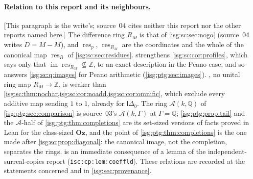 \documentclass[11pt]{article}
\theoremstyle{definition}
\theoremstyle{remark}
\newcommand{\Oz}{\ensuremath{\mathbf{Oz}}}
\newcommand{\Z}{\mathbb{Z}}
\newcommand{\Q}{\mathbb{Q}}
\newcommand{\res}{\operatorname{res}}
\newcommand{\Idelta}{\mathsf{I}\Delta_0}
\newcommand{\im}{\operatorname{im}}
\newcommand{\Asc}{\mathcal{A}}
\newcommand{\replabel}[1]{\nolinkurl{#1}}
\begin{document}
\paragraph{Relation to this report and its neighbours.}
\textup{[}This paragraph is the write's; source~04 cites neither this report
nor the other reports named here.\textup{]} The difference ring $R_M$ is
that of \cref{isg:sc:sec:nogo} (source~04 writes $D=M-M$), and $\res_p$,
$\res_{R_M}$ are the coordinates and the whole of the canonical map
$\res_R$ of \cref{isg:sc:sec:residues}. 
strengthens \cref{isg:sc:cor:profiles}, which says only that
$\im\res_{R_M}\not\subseteq\Z$, to an exact description in the Peano case,
and so answers \cref{isg:sc:q:images} for Peano arithmetic
(\cref{isg:ptg:sec:images}). , no unital ring map
$R_M\to\Z$, is weaker than \cref{isg:sc:thm:nochar,isg:sc:cor:noadd,isg:sc:cor:omnific},
which exclude every additive map sending $1$ to $1$, already for $\Idelta$.
The ring $\Asc(k,\Q)$ of \cref{isg:ptg:sec:comparison} is source~03's
$\Asc(k,\Gamma)$ at $\Gamma=\Q$; \cref{isg:ptg:prop:tail} and the
$\Asc$-half of \cref{isg:ptg:thm:completions} are its set-sized versions of
facts proved in Lean for the class-sized $\Oz$, and the point of
\cref{isg:ptg:thm:completions} is the one made after
\cref{isg:sc:prop:diagonal}: the canonical image, not the completion,
separates the rings.  is an immediate consequence of
a lemma of the independent-surreal-copies report
(\replabel{isc:cp:lem:coeffld}). These relations are recorded at the
statements concerned and in \cref{isg:sec:provenance}.
\end{document}
